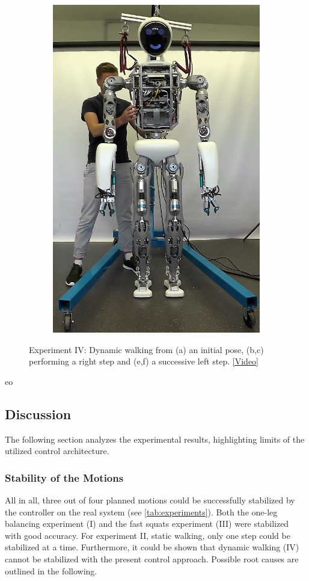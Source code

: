 \begin{figure}[h!]
\begin{subfigure}{.2\textwidth}
	\includegraphics[width=.95\linewidth]{experiments/walkDynamic/snaps/5}
	\caption{}
	\end{subfigure}%
\caption[Experiment IV: Dynamic walking]{Experiment IV: Dynamic walking from (a) an initial pose, (b,c) performing a right step and (e,f) a successive left step. \href{https://github.com/julesser/ma-thesis-experimental-results/blob/master/walkDynamic/walkDynamicFail.mp4}{[Video]}}
\label{exp:dynamicWalkingSnaps}
\end{figure} 
eo
\subsection{Discussion}
The following section analyzes the experimental results, highlighting limits of the utilized control architecture.
\subsubsection{Stability of the Motions}
All in all, three out of four planned motions could be successfully stabilized by the  controller on the real system (see \cref{tab:experiments}). Both the one-leg balancing experiment (I) and the fast squats experiment (III) were stabilized with good accuracy. For experiment II, static walking, only one step could be stabilized at a time. Furthermore, it could be shown that dynamic walking (IV) cannot be stabilized with the present control approach. Possible root causes are outlined in the following. 
